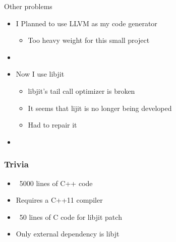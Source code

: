\documentclass{beamer}
\begin{document}
	\begin{frame}
		\begin{center}
			Other problems \\

			\vspace*{18pt}

			\begin{itemize}[<+->]

				\item I Planned to use LLVM as my code generator
					\begin{itemize}[<+->]
						\item[] Too heavy weight for this small project
					\end{itemize}
				\item[]
				\item Now I use libjit
					\begin{itemize}[<+->]
						\item[] libjit's tail call optimizer is broken
						\item[] It seems that lijit is no longer being developed
						\item[] Had to repair it
					\end{itemize}
				\item[]
			\end{itemize}
		\end{center}
	\end{frame}

	\begin{frame}
		\frametitle{Trivia}

		\begin{center}
			\vspace*{18pt}

			\begin{itemize}
				\itemsep12pt

				\item ~5000 lines of C++ code
				\item Requires a C++11 compiler
				\item ~50 lines of C code for libjit patch
				\item Only external dependency is libjt
			\end{itemize}
		\end{center}
	\end{frame}
\end{document}
